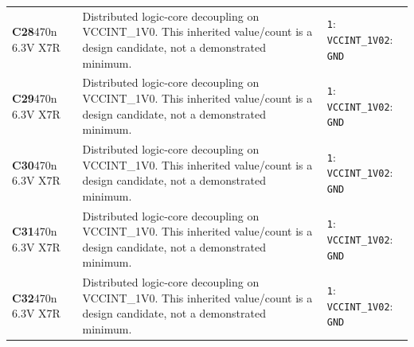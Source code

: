 \documentclass[11pt,a4paper]{article}
\begin{document}
\begin{longtable}{@{}P{27mm}P{84mm}P{57mm}@{}}
\textbf{C28}\newline 470n 6.3V X7R & Distributed logic-core decoupling on VCCINT\_1V0. This inherited value/count is a design candidate, not a demonstrated minimum. & \nolinkurl{1}: \nolinkurl{VCCINT_1V0}\newline \nolinkurl{2}: \nolinkurl{GND} \\
\textbf{C29}\newline 470n 6.3V X7R & Distributed logic-core decoupling on VCCINT\_1V0. This inherited value/count is a design candidate, not a demonstrated minimum. & \nolinkurl{1}: \nolinkurl{VCCINT_1V0}\newline \nolinkurl{2}: \nolinkurl{GND} \\
\textbf{C30}\newline 470n 6.3V X7R & Distributed logic-core decoupling on VCCINT\_1V0. This inherited value/count is a design candidate, not a demonstrated minimum. & \nolinkurl{1}: \nolinkurl{VCCINT_1V0}\newline \nolinkurl{2}: \nolinkurl{GND} \\
\textbf{C31}\newline 470n 6.3V X7R & Distributed logic-core decoupling on VCCINT\_1V0. This inherited value/count is a design candidate, not a demonstrated minimum. & \nolinkurl{1}: \nolinkurl{VCCINT_1V0}\newline \nolinkurl{2}: \nolinkurl{GND} \\
\textbf{C32}\newline 470n 6.3V X7R & Distributed logic-core decoupling on VCCINT\_1V0. This inherited value/count is a design candidate, not a demonstrated minimum. & \nolinkurl{1}: \nolinkurl{VCCINT_1V0}\newline \nolinkurl{2}: \nolinkurl{GND} \\

\end{longtable}
\end{document}

